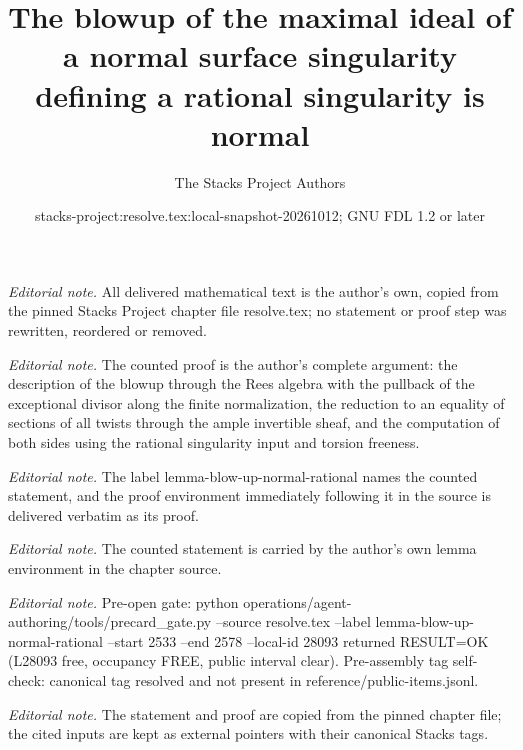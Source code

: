 \documentclass[10pt,a4paper]{amsart}
\title{The blowup of the maximal ideal of a normal surface singularity defining a rational singularity is normal}
\author{The Stacks Project Authors}
\date{stacks-project:resolve.tex:local-snapshot-20261012; GNU FDL 1.2 or later}
\theoremstyle{plain}
\theoremstyle{definition}
\theoremstyle{remark}
\numberwithin{equation}{subsection}
\begin{document}
\maketitle
\noindent\textit{Editorial note.} All delivered mathematical text is the author's own, copied from the pinned Stacks Project chapter file resolve.tex; no statement or proof step was rewritten, reordered or removed.\par\medskip
\noindent\textit{Editorial note.} The counted proof is the author's complete argument: the description of the blowup through the Rees algebra with the pullback of the exceptional divisor along the finite normalization, the reduction to an equality of sections of all twists through the ample invertible sheaf, and the computation of both sides using the rational singularity input and torsion freeness.\par\medskip
\noindent\textit{Editorial note.} The label lemma-blow-up-normal-rational names the counted statement, and the proof environment immediately following it in the source is delivered verbatim as its proof.\par\medskip
\noindent\textit{Editorial note.} The counted statement is carried by the author's own lemma environment in the chapter source.\par\medskip
\noindent\textit{Editorial note.} Pre-open gate: python operations/agent-authoring/tools/precard\_gate.py --source resolve.tex --label lemma-blow-up-normal-rational --start 2533 --end 2578 --local-id 28093 returned RESULT=OK (L28093 free, occupancy FREE, public interval clear). Pre-assembly tag self-check: canonical tag resolved and not present in reference/public-items.jsonl.\par\medskip
\noindent\textit{Editorial note.} The statement and proof are copied from the pinned chapter file; the cited inputs are kept as external pointers with their canonical Stacks tags.\par\medskip
\end{document}
